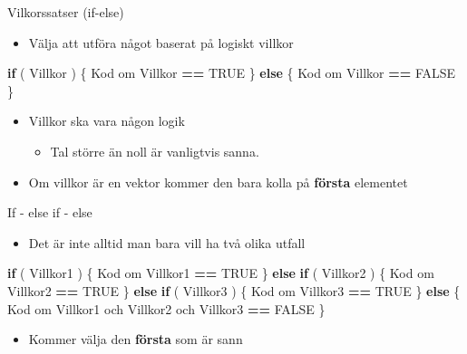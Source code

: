 \documentclass[
  11pt,
  ignorenonframetext,
]{beamer}
\newenvironment{Shaded}{\begin{snugshade}}{\end{snugshade}}
\newcommand{\ConstantTok}[1]{\textcolor[rgb]{0.56,0.35,0.01}{#1}}
\newcommand{\ControlFlowTok}[1]{\textcolor[rgb]{0.13,0.29,0.53}{\textbf{#1}}}
\newcommand{\NormalTok}[1]{#1}
\newcommand{\SpecialCharTok}[1]{\textcolor[rgb]{0.81,0.36,0.00}{\textbf{#1}}}
\providecommand{\tightlist}{%
  \setlength{\itemsep}{0pt}\setlength{\parskip}{0pt}}
\newcommand\imp[1]{\alert{\textbf{#1}}}
\begin{document}
\begin{frame}[fragile]{Vilkorssatser (if-else)}
\label{vilkorssatser-if-else}
\begin{itemize}
\tightlist
\item
  Välja att utföra något baserat på logiskt villkor
\end{itemize}

\begin{Shaded}
\begin{Highlighting}[]
\ControlFlowTok{if}\NormalTok{ ( Villkor ) \{}
\NormalTok{  Kod om Villkor }\SpecialCharTok{==} \ConstantTok{TRUE}
\NormalTok{\} }\ControlFlowTok{else}\NormalTok{ \{}
\NormalTok{  Kod om Villkor }\SpecialCharTok{==} \ConstantTok{FALSE}
\NormalTok{\}}
\end{Highlighting}
\end{Shaded}

\begin{itemize}
\tightlist
\item
  Villkor ska vara någon logik

  \begin{itemize}
  \tightlist
  \item
    Tal större än noll är vanligtvis sanna.
  \end{itemize}
\item
  Om villkor är en vektor kommer den bara kolla på \imp{första}
  elementet
\end{itemize}
\end{frame}

\begin{frame}[fragile]{If - else if - else}
\label{if---else-if---else}
\begin{itemize}
\tightlist
\item
  Det är inte alltid man bara vill ha två olika utfall
\end{itemize}

\begin{Shaded}
\begin{Highlighting}[]
\ControlFlowTok{if}\NormalTok{ ( Villkor1 ) \{}
\NormalTok{  Kod om Villkor1 }\SpecialCharTok{==} \ConstantTok{TRUE}
\NormalTok{\} }\ControlFlowTok{else} \ControlFlowTok{if}\NormalTok{ ( Villkor2 ) \{}
\NormalTok{  Kod om Villkor2 }\SpecialCharTok{==} \ConstantTok{TRUE}
\NormalTok{\} }\ControlFlowTok{else} \ControlFlowTok{if}\NormalTok{ ( Villkor3 ) \{}
\NormalTok{  Kod om Villkor3 }\SpecialCharTok{==} \ConstantTok{TRUE}
\NormalTok{\} }\ControlFlowTok{else}\NormalTok{ \{}
\NormalTok{  Kod om Villkor1 och Villkor2 och Villkor3 }\SpecialCharTok{==} \ConstantTok{FALSE}
\NormalTok{\}}
\end{Highlighting}
\end{Shaded}

\begin{itemize}
\tightlist
\item
  Kommer välja den \imp{första} som är sann
\end{itemize}
\end{frame}
\end{document}
